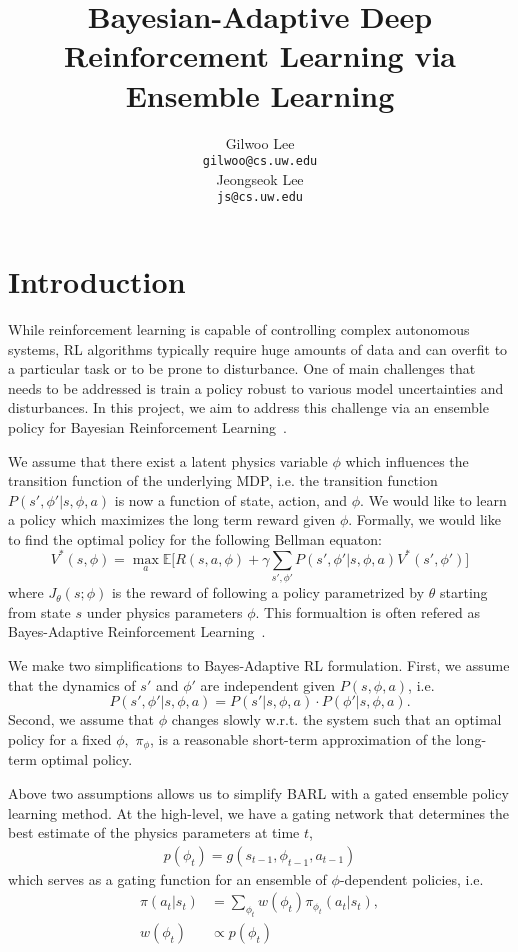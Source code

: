 \documentclass{article}
\title{Bayesian-Adaptive Deep Reinforcement Learning via Ensemble Learning}
\author{Gilwoo Lee \\
  \texttt{gilwoo@cs.uw.edu} \\
  \And
  Jeongseok Lee \\
  \texttt{js@cs.uw.edu}
}
\begin{document}

\maketitle

\section{Introduction}
While reinforcement learning is capable of controlling complex autonomous systems, RL algorithms typically require huge amounts of data and can overfit to a particular task or to be prone to disturbance. One of main challenges that needs to be addressed is train a policy robust to various model uncertainties and disturbances. In this project, we aim to address this challenge via an ensemble policy for Bayesian Reinforcement Learning~\cite{ghavamzadeh2015bayesian}.

We assume that there exist a latent physics variable $\phi$ which influences the transition function of the underlying MDP, i.e. the transition function  $P(s',\phi' |s, \phi, a)$ is now a function of state, action, and $\phi$. We would like to learn a policy which maximizes the long term reward given $\phi$. Formally, we would like to find the optimal policy for the following Bellman equaton:
\begin{equation}\label{eq:rl}
V^*(s, \phi) = \max_a \mathbb{E} \bigg[R(s, a, \phi) + \gamma \sum_{s', \phi'}P(s',\phi'|s, \phi, a)V^*(s', \phi') \bigg]
\end{equation}
where $J_\theta(s; \phi)$ is the reward of following a policy parametrized by $\theta$ starting from state $s$ under physics parameters $\phi$. This formualtion is often refered as Bayes-Adaptive Reinforcement Learning~\cite{ghavamzadeh2015bayesian}.

We make two simplifications to Bayes-Adaptive RL formulation. First, we assume that the dynamics of $s'$ and $\phi'$ are independent given $P(s, \phi, a)$, i.e.
\begin{equation*}
P(s',\phi'|s, \phi, a) = P(s'|s, \phi, a)\cdot P(\phi'|s, \phi, a).
\end{equation*}
Second, we assume that $\phi$ changes slowly w.r.t. the system such that an optimal policy for a fixed $\phi,$
$\pi_{\phi}$, is a reasonable short-term approximation of the long-term optimal policy.

Above two assumptions allows us to simplify BARL with a gated ensemble policy learning method. At the high-level, we have a gating network that determines the best estimate of the physics parameters at time $t$,
\begin{align*}
p(\phi_t) = g(s_{t-1}, \phi_{t-1}, a_{t-1})
\end{align*}
which serves as a gating function for an ensemble of $\phi$-dependent policies, i.e.
\begin{align*}
\pi(a_t | s_t) &= \sum_{\phi_t} w(\phi_t) \pi_{\phi_t}(a_t | s_t), \\
w(\phi_t) &\propto p(\phi_t)
\end{align*}
\end{document}
